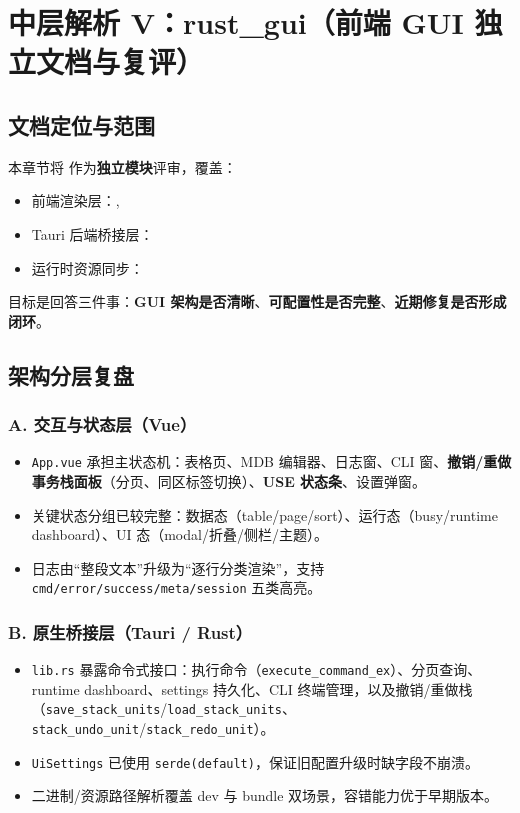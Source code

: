 \section{中层解析 V：rust\_gui（前端 GUI 独立文档与复评）}

\subsection{文档定位与范围}

本章节将  作为\textbf{独立模块}评审，覆盖：
\begin{itemize}
  \item 前端渲染层：, 
  \item Tauri 后端桥接层：
  \item 运行时资源同步：
\end{itemize}

目标是回答三件事：\textbf{GUI 架构是否清晰}、\textbf{可配置性是否完整}、\textbf{近期修复是否形成闭环}。

\subsection{架构分层复盘}

\subsubsection{A. 交互与状态层（Vue）}
\begin{itemize}
  \item \texttt{App.vue} 承担主状态机：表格页、MDB 编辑器、日志窗、CLI 窗、\textbf{撤销/重做事务栈面板}（分页、同区标签切换）、\textbf{USE 状态条}、设置弹窗。
  \item 关键状态分组已较完整：数据态（table/page/sort）、运行态（busy/runtime dashboard）、UI 态（modal/折叠/侧栏/主题）。
  \item 日志由“整段文本”升级为“逐行分类渲染”，支持 \texttt{cmd/error/success/meta/session} 五类高亮。
\end{itemize}

\subsubsection{B. 原生桥接层（Tauri / Rust）}
\begin{itemize}
  \item \texttt{lib.rs} 暴露命令式接口：执行命令（\texttt{execute\_command\_ex}）、分页查询、runtime dashboard、settings 持久化、CLI 终端管理，以及撤销/重做栈（\texttt{save\_stack\_units}/\texttt{load\_stack\_units}、\texttt{stack\_undo\_unit}/\texttt{stack\_redo\_unit}）。
  \item \texttt{UiSettings} 已使用 \texttt{serde(default)}，保证旧配置升级时缺字段不崩溃。
  \item 二进制/资源路径解析覆盖 dev 与 bundle 双场景，容错能力优于早期版本。
\end{itemize}

